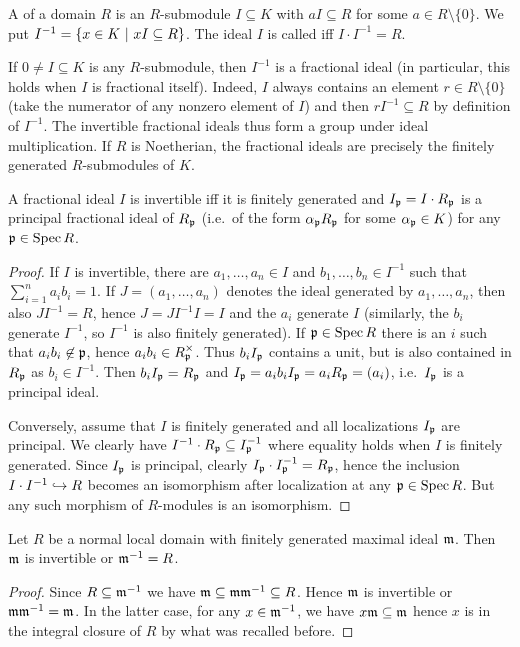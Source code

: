\documentclass[a4paper,parskip=half,numbers=enddot, DIV=12, headheight=30pt]{scrreprt}
\begin{document}
\begin{defi}  %
    A  of a domain $R$ is an $R$-submodule $I\subseteq K$ with $a I \subseteq R$ for some $a\in R\setminus \{0\}$. We put $I^{-1} = \left\{x\in K\ \middle|\  xI\subseteq R\right\}$. The ideal $I$ is called  iff $I\cdot I^{-1}  = R$. 
\end{defi}
If $0\neq I\subseteq K$ is any $R$-submodule, then $I^{-1}$ is a fractional ideal (in particular, this holds when $I$ is fractional itself). Indeed, $I$ always contains an element $r\in R\setminus\{0\}$ (take the numerator of any nonzero element of $I$) and then $rI^{-1}\subseteq R$ by definition of $I^{-1}$. The invertible fractional ideals thus form a group under ideal multiplication. If $R$ is Noetherian, the fractional ideals are precisely the finitely generated $R$-submodules of $K$.
\begin{prop}
    A fractional ideal $I$ is invertible iff it is finitely generated and $I_{\mathfrak{p}}=I\cdot R_{\mathfrak{p}}$ is a principal fractional ideal of $R_{\mathfrak{p}}$ (i.e.\ of the form $\alpha_{\mathfrak{p}} R_{\mathfrak{p}}$ for some $\alpha_{\mathfrak{p}}\in K$) for any $\mathfrak{p}\in \operatorname{Spec} R$.
\end{prop}
\begin{proof}
    If $I$ is invertible, there are $a_1,\ldots,a_n\in I$ and $b_1,\ldots,b_n\in I^{-1}$ such that $\sum_{i=1}^n a_i b_i = 1$. If $J=(a_1,\ldots,a_n)$ denotes the ideal generated by $a_1,\ldots,a_n$, then also $JI^{-1}=R$, hence $J=JI^{-1}I=I$ and the $a_i$ generate $I$ (similarly, the $b_i$ generate $I^{-1}$, so $I^{-1}$ is also finitely generated). If $\mathfrak{p}\in \operatorname{Spec} R$ there is an $i$ such that $a_ib_i\not\in  \mathfrak{p}$, hence $a_ib_i\in R_{\mathfrak{p}}^\times$. Thus $b_iI_{\mathfrak{p}}$ contains a unit, but is also contained in $R_{\mathfrak{p}}$ as $b_i\in I^{-1}$. Then $b_iI_{\mathfrak{p}}=R_{\mathfrak{p}}$ and $I_{\mathfrak{p}}=a_ib_iI_{\mathfrak{p}}=a_iR_{\mathfrak{p}}=(a_i)$, i.e.\ $I_{\mathfrak{p}}$ is a principal ideal.
    
    Conversely, assume that $I$ is finitely generated and all localizations $I_{\mathfrak{p}}$ are principal. We clearly have $I^{-1}\cdot R_{\mathfrak{p}}\subseteq I_{\mathfrak{p}}^{-1}$ where equality holds when $I$ is finitely generated. Since $I_{\mathfrak{p}}$ is principal, clearly $I_{\mathfrak{p}}\cdot I_{\mathfrak{p}}^{-1} = R_{\mathfrak{p}}$, hence the inclusion $I\cdot I^{-1}\monomorphism R$ becomes an isomorphism after localization at any $\mathfrak{p}\in \operatorname{Spec} R$. But any such morphism of $R$-modules is an isomorphism.
\end{proof}
\begin{lem}
    Let $R$ be a normal local domain with finitely generated maximal ideal $\mathfrak{m}$. Then $\mathfrak{m}$ is invertible or $\mathfrak{m}^{-1} = R$.
\end{lem}
\begin{proof}
    Since $R\subseteq \mathfrak{m}^{-1}$ we have $\mathfrak{m}\subseteq \mathfrak{m} \mathfrak{m}^{-1} \subseteq R$. Hence $\mathfrak{m}$ is invertible or $\mathfrak{m}\mathfrak{m}^{-1} = \mathfrak{m}$. In the latter case, for any $x\in \mathfrak{m}^{-1}$, we have $x\mathfrak{m} \subseteq \mathfrak{m}$ hence $x$ is in the integral closure of $R$ by what was recalled before.
\end{proof}
\end{document}
